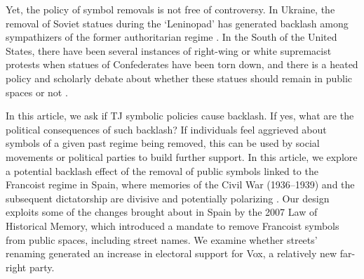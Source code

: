 \documentclass[12pt, notitlepage]{article}
\begin{document}
Yet, the policy of symbol removals is not free of controversy. In Ukraine, the removal of Soviet statues during the `Leninopad' has generated backlash among sympathizers of the former authoritarian regime \citep{Rozenas:2021}. In the South of the United States, there have been several instances of right-wing or white supremacist protests when statues of Confederates have been torn down, and there is a heated policy and scholarly debate about whether these statues should remain in public spaces or not \citep{Grossman:2016}.


In this article, we ask if TJ symbolic policies cause backlash. If yes, what are the political consequences of such backlash? If individuals feel aggrieved about symbols of a given past regime being removed, this can be used by social movements or political parties to build further support.
In this article, we explore a potential backlash effect of the removal of public symbols linked to the Francoist regime in Spain, where memories of the Civil War (1936--1939) and the subsequent dictatorship are divisive and potentially polarizing \citep{Balcells:2012aa}.
Our design exploits some of the changes brought about in Spain by the 2007 Law of Historical Memory, which introduced a mandate to remove Francoist symbols from public spaces, including street names. We examine whether streets' renaming generated an increase in electoral support for Vox, a relatively new far-right party.
\end{document}
